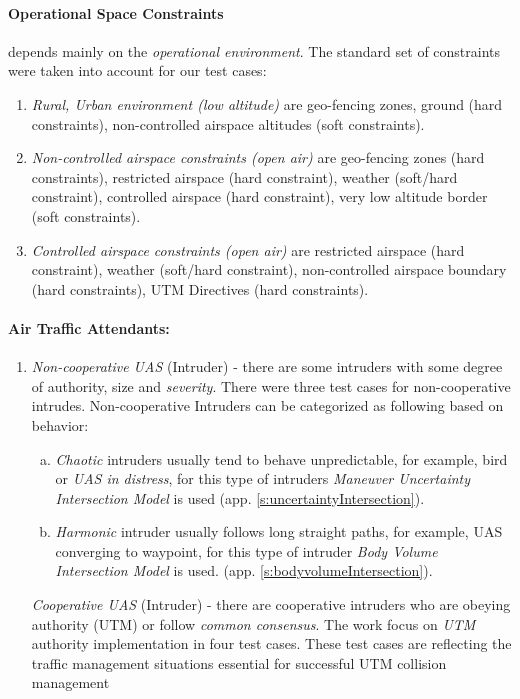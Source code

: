 \paragraph{Operational Space Constraints} depends mainly on the  \emph{operational environment}.  The standard set of constraints were taken into account for our test cases:
\begin{enumerate}
    \item \emph{Rural, Urban environment (low altitude)} are geo-fencing zones, ground (hard constraints), non-controlled airspace altitudes (soft constraints).
    
    \item \emph{Non-controlled airspace constraints (open air)} are  geo-fencing zones (hard constraints), restricted airspace (hard constraint), weather (soft/hard constraint), controlled airspace (hard constraint), very low altitude border (soft constraints).
    
    \item \emph{Controlled airspace constraints (open air)} are  restricted airspace (hard constraint), weather (soft/hard constraint), non-controlled airspace boundary (hard constraints), UTM Directives (hard constraints).
\end{enumerate}

\paragraph{Air Traffic Attendants:} 
\begin{enumerate}
    \item \emph{Non-cooperative UAS} (Intruder) -  there are some intruders with some degree of authority, size and \emph{severity}. There were three test cases for non-cooperative intrudes. Non-cooperative Intruders can be categorized as following based on behavior:
    \begin{enumerate}[a.]
        \item\emph{Chaotic} intruders usually tend to behave unpredictable, for example, bird or \emph{UAS in distress}, for this type of intruders \emph{Maneuver Uncertainty  Intersection Model} is used (app. \ref{s:uncertaintyIntersection}).
        
        \item\emph{Harmonic} intruder usually follows long straight paths, for example, UAS converging to waypoint, for this type of intruder \emph{Body Volume Intersection Model} is used. (app. \ref{s:bodyvolumeIntersection}).
    \end{enumerate}

    \emph{Cooperative UAS} (Intruder) -  there are cooperative intruders who are obeying authority (UTM) or follow \emph{common consensus}. The work focus on \emph{UTM} authority implementation in four test cases. These test cases are reflecting the traffic management situations essential for successful UTM collision management
\end{enumerate}
    
